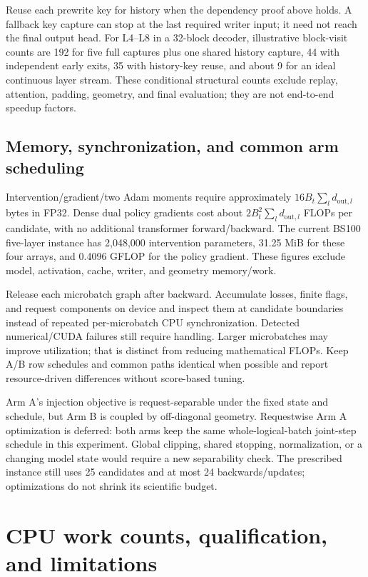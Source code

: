 \documentclass[11pt]{article}
\begin{document}
Reuse each prewrite key for history when the dependency proof above holds.
A fallback key capture can stop at the last required writer input; it need
not reach the final output head. For L4--L8 in a 32-block decoder, illustrative
block-visit counts are 192 for five full captures plus one shared history
capture, 44 with independent early exits, 35 with history-key reuse, and
about 9 for an ideal continuous layer stream. These conditional structural
counts exclude replay, attention, padding, geometry, and final evaluation;
they are not end-to-end speedup factors.

\subsection{Memory, synchronization, and common arm scheduling}

Intervention/gradient/two Adam moments require approximately
$16B_t\sum_l d_{\mathrm{out},l}$ bytes in FP32. Dense dual policy gradients
cost about $2B_t^2\sum_l d_{\mathrm{out},l}$ FLOPs per candidate, with no
additional transformer forward/backward. The current BS100 five-layer
instance has 2,048,000 intervention parameters, 31.25 MiB for these four
arrays, and 0.4096 GFLOP for the policy gradient. These figures exclude
model, activation, cache, writer, and geometry memory/work.

Release each microbatch graph after backward. Accumulate losses, finite
flags, and request components on device and inspect them at candidate
boundaries instead of repeated per-microbatch CPU synchronization.
Detected numerical/CUDA failures still require handling. Larger
microbatches may improve utilization; that is distinct from reducing
mathematical FLOPs. Keep A/B row schedules and common paths identical when
possible and report resource-driven differences without score-based tuning.

Arm A's injection objective is request-separable under the fixed state and
schedule, but Arm B is coupled by off-diagonal geometry. Requestwise Arm A
optimization is deferred: both arms keep the same whole-logical-batch
joint-step schedule in this experiment. Global clipping, shared stopping,
normalization, or a changing model state would require a new separability
check. The prescribed instance still uses 25 candidates and at most 24
backwards/updates; optimizations do not shrink its scientific budget.

\clearpage
\section{CPU work counts, qualification, and limitations}
\end{document}
